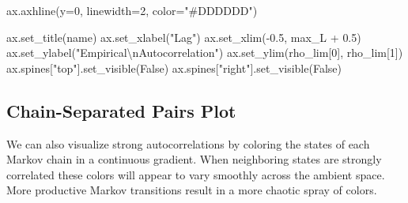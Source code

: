 \documentclass[
  letterpaper,
  DIV=11,
  numbers=noendperiod]{scrartcl}
\newenvironment{Shaded}{\begin{snugshade}}{\end{snugshade}}
\newcommand{\CharTok}[1]{\textcolor[rgb]{0.13,0.47,0.30}{#1}}
\newcommand{\DecValTok}[1]{\textcolor[rgb]{0.68,0.00,0.00}{#1}}
\newcommand{\FloatTok}[1]{\textcolor[rgb]{0.68,0.00,0.00}{#1}}
\newcommand{\NormalTok}[1]{\textcolor[rgb]{0.00,0.23,0.31}{#1}}
\newcommand{\OperatorTok}[1]{\textcolor[rgb]{0.37,0.37,0.37}{#1}}
\newcommand{\StringTok}[1]{\textcolor[rgb]{0.13,0.47,0.30}{#1}}
\newcommand{\VariableTok}[1]{\textcolor[rgb]{0.07,0.07,0.07}{#1}}
\begin{document}
\begin{Shaded}
\begin{Highlighting}[]
\NormalTok{  ax.axhline(y}\OperatorTok{=}\DecValTok{0}\NormalTok{, linewidth}\OperatorTok{=}\DecValTok{2}\NormalTok{, color}\OperatorTok{=}\StringTok{"\#DDDDDD"}\NormalTok{)}
  
\NormalTok{  ax.set\_title(name)}
\NormalTok{  ax.set\_xlabel(}\StringTok{"Lag"}\NormalTok{)}
\NormalTok{  ax.set\_xlim(}\OperatorTok{{-}}\FloatTok{0.5}\NormalTok{, max\_L }\OperatorTok{+} \FloatTok{0.5}\NormalTok{)}
\NormalTok{  ax.set\_ylabel(}\StringTok{"Empirical}\CharTok{\textbackslash{}n}\StringTok{Autocorrelation"}\NormalTok{)}
\NormalTok{  ax.set\_ylim(rho\_lim[}\DecValTok{0}\NormalTok{], rho\_lim[}\DecValTok{1}\NormalTok{])}
\NormalTok{  ax.spines[}\StringTok{"top"}\NormalTok{].set\_visible(}\VariableTok{False}\NormalTok{)}
\NormalTok{  ax.spines[}\StringTok{"right"}\NormalTok{].set\_visible(}\VariableTok{False}\NormalTok{)}
\end{Highlighting}
\end{Shaded}

\subsection{Chain-Separated Pairs
Plot}\label{chain-separated-pairs-plot}

We can also visualize strong autocorrelations by coloring the states of
each Markov chain in a continuous gradient. When neighboring states are
strongly correlated these colors will appear to vary smoothly across the
ambient space. More productive Markov transitions result in a more
chaotic spray of colors.
\end{document}
